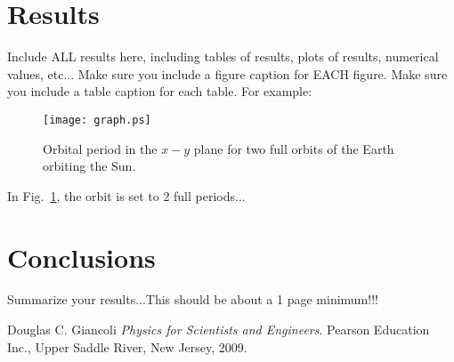 \documentclass[11pt]{article}
\begin{document}
\section{Results}
\noindent Include ALL results here, including tables of results, plots of results, numerical values, etc...
Make sure you include a figure caption for EACH figure.  Make sure you include a table caption for each table.
For example:
\begin{figure}[ht]
\centering
\texttt{[image: graph.ps]}
\caption{Orbital period in the $x-y$ plane for two full orbits of the Earth orbiting the Sun.}
\label{fig:graph}
\end{figure}
\noindent In Fig.~\ref{fig:graph}, the orbit is set to 2 full periods...

\section{Conclusions}
\noindent Summarize your results...This should be about a 1 page minimum!!!


\begin{thebibliography}{99}

Douglas C. Giancoli
\textit{Physics for Scientists and Engineers}. 
Pearson Education Inc., Upper Saddle River, New Jersey, 2009.

\end{thebibliography}
\end{document}
